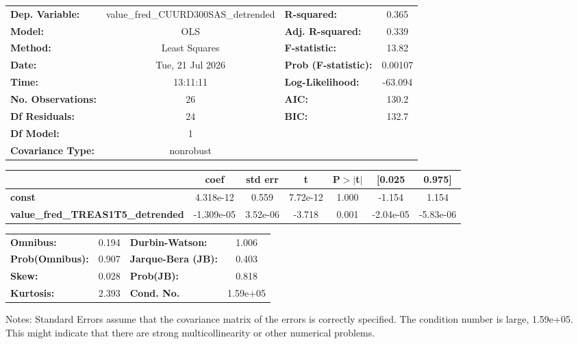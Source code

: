 \begin{center}
\begin{tabular}{lclc}
\toprule
\textbf{Dep. Variable:}                   & value\_fred\_CUURD300SAS\_detrended & \textbf{  R-squared:         } &     0.365   \\
\textbf{Model:}                           &                 OLS                 & \textbf{  Adj. R-squared:    } &     0.339   \\
\textbf{Method:}                          &            Least Squares            & \textbf{  F-statistic:       } &     13.82   \\
\textbf{Date:}                            &           Tue, 21 Jul 2026          & \textbf{  Prob (F-statistic):} &  0.00107    \\
\textbf{Time:}                            &               13:11:11              & \textbf{  Log-Likelihood:    } &   -63.094   \\
\textbf{No. Observations:}                &                    26               & \textbf{  AIC:               } &     130.2   \\
\textbf{Df Residuals:}                    &                    24               & \textbf{  BIC:               } &     132.7   \\
\textbf{Df Model:}                        &                     1               & \textbf{                     } &             \\
\textbf{Covariance Type:}                 &              nonrobust              & \textbf{                     } &             \\
\bottomrule
\end{tabular}
\begin{tabular}{lcccccc}
                                          & \textbf{coef} & \textbf{std err} & \textbf{t} & \textbf{P$> |$t$|$} & \textbf{[0.025} & \textbf{0.975]}  \\
\midrule
\textbf{const}                            &    4.318e-12  &        0.559     &  7.72e-12  &         1.000        &       -1.154    &        1.154     \\
\textbf{value\_fred\_TREAS1T5\_detrended} &   -1.309e-05  &     3.52e-06     &    -3.718  &         0.001        &    -2.04e-05    &    -5.83e-06     \\
\bottomrule
\end{tabular}
\begin{tabular}{lclc}
\textbf{Omnibus:}       &  0.194 & \textbf{  Durbin-Watson:     } &    1.006  \\
\textbf{Prob(Omnibus):} &  0.907 & \textbf{  Jarque-Bera (JB):  } &    0.403  \\
\textbf{Skew:}          &  0.028 & \textbf{  Prob(JB):          } &    0.818  \\
\textbf{Kurtosis:}      &  2.393 & \textbf{  Cond. No.          } & 1.59e+05  \\
\bottomrule
\end{tabular}
\end{center}

Notes: \newline
 [1] Standard Errors assume that the covariance matrix of the errors is correctly specified. \newline
 [2] The condition number is large, 1.59e+05. This might indicate that there are \newline
 strong multicollinearity or other numerical problems.